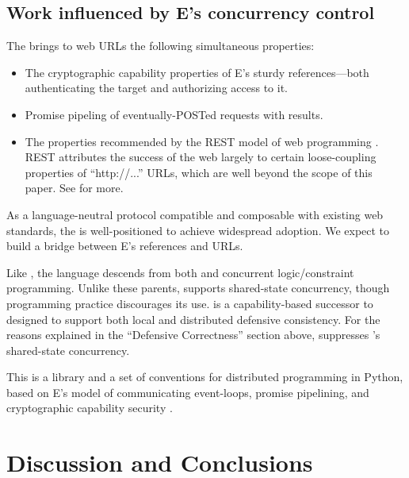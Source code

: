 \documentclass{llncs}
\begin{document}
\subsection{Work influenced by E's concurrency control}

 The  \cite{tyler:webcalc}
brings to web URLs the following simultaneous properties:
%
\begin{itemize}
\item The cryptographic capability properties of E's sturdy
  references---both authenticating the target and authorizing access
  to it.
\item Promise pipeling of eventually-POSTed requests with results.
\item The properties recommended by the REST model of web programming
  \cite{fielding:rest}. REST attributes the success of the web largely
  to certain loose-coupling properties of ``http://...''  URLs, which
  are well beyond the scope of this paper. See
  \cite{fielding:rest,tyler:webcalc} for more.
\end{itemize}
%
As a language-neutral protocol compatible and composable with existing
web standards, the  is well-positioned 
to achieve widespread adoption. We expect to build a bridge between
E's references and  URLs.

 Like , the  language
\cite{VanRoyHaridi} descends from both  and concurrent
logic/constraint programming. Unlike these parents,  supports
shared-state concurrency, though  programming practice
discourages its use.  \cite{oze} is a capability-based
successor to  designed to support both local and distributed
defensive consistency. For the reasons explained in the ``Defensive
Correctness'' section above,  suppresses 's
shared-state concurrency.

 This is a library and a set of
conventions for distributed programming in Python, based on E's model
of communicating event-loops, promise pipelining, and cryptographic
capability security \cite{twisted}.

\section{Discussion and Conclusions}

\end{document}
